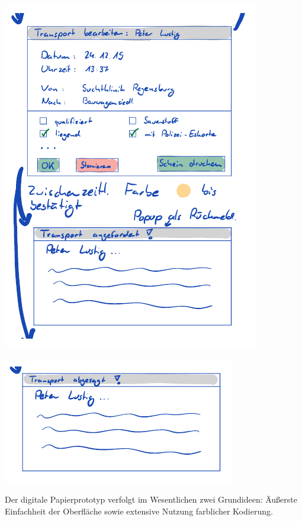 \documentclass[a4paper, ngerman, 12pt]{scrartcl}
\begin{document}
\begin{center}
\begin{minipage}[b]{0.48\textwidth}
	\includegraphics[width=\textwidth]{Bilder/PrototypTobias2.png}
	\label{img:winter2}
\end{minipage}
\end{center}
\begin{center}
\begin{minipage}{0.5\textwidth}
	\centering
	\includegraphics[width=\textwidth]{Bilder/PrototypTobias3.png}
	\label{img:winter3}
\end{minipage}
\end{center}
Der digitale Papierprototyp verfolgt im Wesentlichen zwei Grundideen: Äußerste Einfachheit der Oberfläche sowie extensive Nutzung farblicher Kodierung.\\
\end{document}

